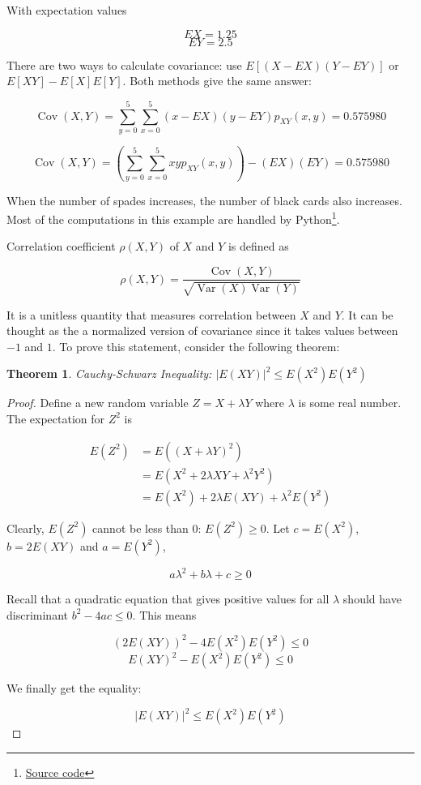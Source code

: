 \documentclass[12pt, a4paper]{article}
\newcounter{exa}
\newcommand{\Var}{\operatorname{Var}}
\newcommand{\Cov}{\operatorname{Cov}}
\newtheorem*{theorem}{Theorem}
\begin{document}
\begin{texample}
With expectation values

\[EX=1.25\]
\[EY=2.5\]

There are two ways to calculate covariance: use $E[(X-EX)(Y-EY)]$ or $E[XY]-E[X]E[Y]$. Both methods give the same answer:

\[\Cov(X,Y)=\sum_{y=0}^5\sum_{x=0}^5 (x-EX)(y-EY) p_{XY}(x,y)=0.575980\]

\[\Cov(X,Y)=\left( \sum_{y=0}^5\sum_{x=0}^5 xyp_{XY}(x,y) \right)-(EX)(EY)=0.575980\]

When the number of spades increases, the number of black cards also increases. \\

Most of the computations in this example are handled by Python\footnote{\href{https://gist.github.com/marethyu/777e372c69cb356c5fc8c93f59cf62e6}{Source code}}.
\end{texample}

Correlation coefficient $\rho(X,Y)$ of $X$ and $Y$ is defined as

\[\rho(X,Y)=\frac{\Cov(X,Y)}{\sqrt{\Var(X)\Var(Y)}}\]

It is a unitless quantity that measures correlation between $X$ and $Y$. It can be thought as the a normalized version of covariance since it takes values between $-1$ and $1$. To prove this statement, consider the following theorem:

\begin{theorem}
Cauchy-Schwarz Inequality: $|E(XY)|^2 \le E(X^2)E(Y^2)$
\end{theorem}

\begin{proof}
Define a new random variable $Z=X+\lambda Y$ where $\lambda$ is some real number. \\

The expectation for $Z^2$ is

\begin{align*}
E(Z^2)&=E((X+\lambda Y)^2) \\
&=E(X^2+2\lambda XY+\lambda^2Y^2) \\
&=E(X^2)+2\lambda E(XY)+\lambda^2 E(Y^2)
\end{align*}

Clearly, $E(Z^2)$ cannot be less than 0: $E(Z^2)\ge0$. Let $c=E(X^2)$, $b=2E(XY)$ and $a=E(Y^2)$,

\[ a\lambda^2+b\lambda+c\ge0 \]

Recall that a quadratic equation that gives positive values for all $\lambda$ should have discriminant $b^2-4ac \le 0$. This means

\[(2E(XY))^2-4E(X^2)E(Y^2)\le0\]
\[E(XY)^2-E(X^2)E(Y^2)\le0\]

We finally get the equality:

\[|E(XY)|^2 \le E(X^2)E(Y^2)\]

\end{proof}
\end{document}
